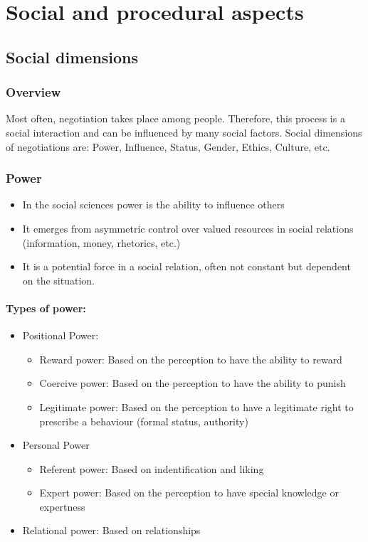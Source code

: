\section{Social and procedural aspects}

\subsection{Social dimensions}

\subsubsection{Overview}

Most often, negotiation takes place among people. Therefore, this process is a
social interaction and can be influenced by many social factors.
Social dimensions of negotiations are: Power, Influence, Status, Gender,
Ethics, Culture, etc.

\subsubsection{Power}

\begin{itemize}
    \item In the social sciences power is the ability to influence others
    \item It emerges from asymmetric control over valued resources in social
        relations (information, money, rhetorics, etc.)
    \item It is a potential force in a social relation, often not constant
        but dependent on the situation.
\end{itemize}

\paragraph{Types of power:}
\begin{itemize}
    \item Positional Power:
        \begin{itemize}
            \item Reward power: Based on the perception to have the ability to reward
            \item Coercive power: Based on the perception to have the ability to punish
            \item Legitimate power: Based on the perception to have a legitimate right
                to prescribe a behaviour (formal status, authority) 
        \end{itemize}
    \item Personal Power
        \begin{itemize}
            \item Referent power: Based on indentification and liking
            \item Expert power: Based on the perception to have special knowledge or
            expertness
        \end{itemize}
    \item Relational power: Based on relationships
\end{itemize}

